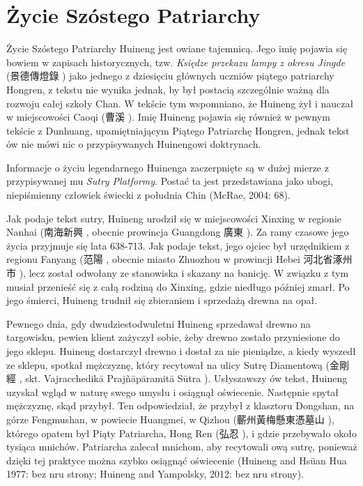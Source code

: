 \section{Życie Szóstego Patriarchy}
Życie Szóstego Patriarchy Huineng jest owiane tajemnicą. Jego imię pojawia się bowiem w zapisach historycznych, tzw. \emph{Księdze przekazu lampy z okresu Jingde} (景德傳燈錄 ) jako jednego z dziesięciu głównych uczniów piątego patriarchy Hongren, z tekstu nie wynika jednak, by był postacią szczególnie ważną dla rozwoju całej szkoły Chan. W tekście tym wspomniano, że Huineng żył i nauczał w miejscowości Caoqi (曹溪 %
). Imię Huineng pojawia się również w pewnym tekście z Dunhuang, upamiętniającym Piątego Patriarchę Hongren, jednak tekst ów nie mówi nic o przypisywanych Huinengowi doktrynach.

Informacje o życiu legendarnego Huinenga zaczerpnięte są w dużej mierze z przypisywanej mu \emph{Sutry Platformy}. Postać ta jest przedstawiana jako ubogi, niepiśmienny człowiek świecki z południa Chin (McRae, 2004: 68).

Jak podaje tekst sutry, Huineng urodził się w miejscowości Xinxing w regionie Nanhai (南海新興 , obecnie prowincja Guangdong 廣東 ). Za ramy czasowe jego życia przyjmuje się lata 638-713.
Jak podaje tekst, jego ojciec był urzędnikiem z regionu Fanyang (范陽 , obecnie miasto Zhuozhou w prowincji Hebei 河北省涿州市 ), lecz został odwołany ze stanowiska i skazany na banicję. W związku z tym musiał przenieść się z całą rodziną do Xinxing, gdzie niedługo później zmarł. Po jego śmierci, Huineng trudnił się zbieraniem i sprzedażą drewna na opał.

Pewnego dnia, gdy dwudziestodwuletni Huineng sprzedawał drewno na targowisku, pewien klient zażyczył sobie, żeby drewno zostało przyniesione do jego sklepu. Huineng dostarczył drewno i dostał za nie pieniądze, a kiedy wyszedł ze sklepu, spotkał mężczyznę, który recytował na ulicy Sutrę Diamentową (金剛經 , skt. Vajracchedikā Prajñāpāramitā Sūtra%
). Usłyszawszy ów tekst, Huineng uzyskał wgląd w naturę swego umysłu i osiągnął oświecenie. Następnie spytał mężczyznę, skąd przybył. Ten odpowiedział, że przybył z klasztoru Dongshan, na górze Fengmushan, w powiecie Huangmei, w Qizhou (蘄州黃梅懸東憑墓山 ), którego opatem był Piąty Patriarcha, Hong Ren (弘忍 ), i gdzie przebywało około tysiąca mnichów. Patriarcha zalecał mnichom, aby recytowali ową sutrę, ponieważ dzięki tej praktyce można szybko osiągnąć oświecenie (Huineng and Hsüan Hua 1977: bez nru strony; Huineng and Yampolsky, 2012: bez nru strony).

